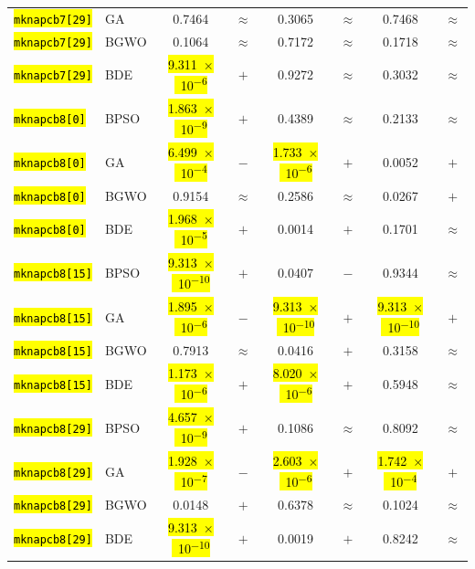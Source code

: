 \documentclass[mathematics,article,accept,moreauthors]{Definitions/mdpi}
\begin{document}
\begin{table}[H]
\begin{tabularx}{\textwidth}{Xlcccccc}
    \texttt{\hl{mknapcb7[29]}} & GA    &    0.7464 & $\approx$ &    0.3065 & $\approx$ &    0.7468 & $\approx$ \\
    \texttt{\hl{mknapcb7[29]}} & BGWO  &    0.1064 & $\approx$ &    0.7172 & $\approx$ &    0.1718 & $\approx$ \\
    \texttt{\hl{mknapcb7[29]}} & BDE   & \hl{9.311~$\times$~10\textsuperscript{$-$6}} & $+$ &    0.9272 & $\approx$ &    0.3032 & $\approx$ \\
    \midrule
    \texttt{\hl{mknapcb8[0]}} & BPSO  & \hl{1.863~$\times$~10\textsuperscript{$-$9}} & $+$ &    0.4389 & $\approx$ &    0.2133 & $\approx$ \\
    \texttt{\hl{mknapcb8[0]}} & GA    & \hl{6.499~$\times$~10\textsuperscript{$-$4}} & $-$ & \hl{1.733~$\times$~10\textsuperscript{$-$6}} & $+$ &    0.0052 & $+$ \\
    \texttt{\hl{mknapcb8[0]}} & BGWO  &    0.9154 & $\approx$ &    0.2586 & $\approx$ &    0.0267 & $+$ \\
    \texttt{\hl{mknapcb8[0]}} & BDE   & \hl{1.968~$\times$~10\textsuperscript{$-$5}} & $+$ &    0.0014 & $+$ &    0.1701 & $\approx$ \\
    \midrule
    \texttt{\hl{mknapcb8[15]}} & BPSO  & \hl{9.313~$\times$~10\textsuperscript{$-$10}} & $+$ &    0.0407 & $-$ &    0.9344 & $\approx$ \\
    \texttt{\hl{mknapcb8[15]}} & GA    & \hl{1.895~$\times$~10\textsuperscript{$-$6}} & $-$ & \hl{9.313~$\times$~10\textsuperscript{$-$10}} & $+$ & \hl{9.313~$\times$~10\textsuperscript{$-$10}} & $+$ \\
    \texttt{\hl{mknapcb8[15]}} & BGWO  &    0.7913 & $\approx$ &    0.0416 & $+$ &    0.3158 & $\approx$ \\
    \texttt{\hl{mknapcb8[15]}} & BDE   & \hl{1.173~$\times$~10\textsuperscript{$-$6}} & $+$ & \hl{8.020~$\times$~10\textsuperscript{$-$6}} & $+$ &    0.5948 & $\approx$ \\
    \midrule
    \texttt{\hl{mknapcb8[29]}} & BPSO  & \hl{4.657~$\times$~10\textsuperscript{$-$9}} & $+$ &    0.1086 & $\approx$ &    0.8092 & $\approx$ \\
    \texttt{\hl{mknapcb8[29]}} & GA    & \hl{1.928~$\times$~10\textsuperscript{$-$7}} & $-$ & \hl{2.603~$\times$~10\textsuperscript{$-$6}} & $+$ & \hl{1.742~$\times$~10\textsuperscript{$-$4}} & $+$ \\
    \texttt{\hl{mknapcb8[29]}} & BGWO  &    0.0148 & $+$ &    0.6378 & $\approx$ &    0.1024 & $\approx$ \\
    \texttt{\hl{mknapcb8[29]}} & BDE   & \hl{9.313~$\times$~10\textsuperscript{$-$10}} & $+$ &    0.0019 & $+$ &    0.8242 & $\approx$ \\




\bottomrule
\end{tabularx} %
\end{table}
\end{document}
